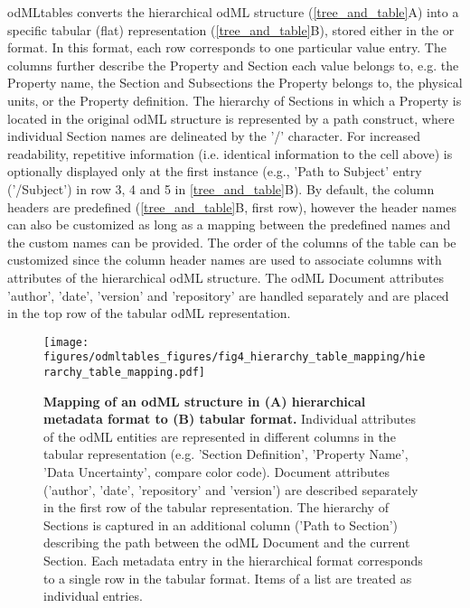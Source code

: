 odMLtables converts the hierarchical odML structure (\cref{tree_and_table}A) into a specific tabular (flat) representation (\cref{tree_and_table}B), stored either in the  or  format. In this format, each row corresponds to one particular value entry. The columns further describe the Property and Section each value belongs to, e.g. the Property name, the Section and Subsections the Property belongs to, the physical units, or the Property definition. The hierarchy of Sections in which a Property is located in the original odML structure is represented by a path construct, where individual Section names are delineated by the '/' character. For increased readability, repetitive information (i.e. identical information to the cell above) is optionally displayed only at the first instance (e.g., 'Path to Subject' entry ('/Subject') in row 3, 4 and 5 in \cref{tree_and_table}B). By default, the  column headers are predefined (\cref{tree_and_table}B, first row), however the header names can also be customized as long as a mapping between the predefined names and the custom names can be provided. The order of the columns of the table can be customized since the column header names are used to associate columns with attributes of the hierarchical odML structure. The odML Document attributes 'author', 'date', 'version' and 'repository' are handled separately and are placed in the top row of the tabular odML representation.

\begin{figure}[h!]
\begin{center}
\texttt{[image: figures/odmltables\_figures/fig4\_hierarchy\_table\_mapping/hierarchy\_table\_mapping.pdf]}
\caption{{\label{fig:tree_and_table}
\textbf{Mapping of an odML structure in (A) hierarchical metadata format to (B) tabular format.} Individual attributes of the odML entities are represented in different columns in the tabular representation (e.g. 'Section Definition', 'Property Name', 'Data Uncertainty', compare color code). Document attributes ('author', 'date', 'repository' and 'version') are described separately in the first row of the tabular representation. The hierarchy of Sections is captured in an additional column ('Path to Section') describing the path between the odML Document and the current Section. Each metadata entry in the hierarchical format corresponds to a single row in the tabular format. Items of a list are treated as individual entries.
}}
\end{center}
\end{figure}

